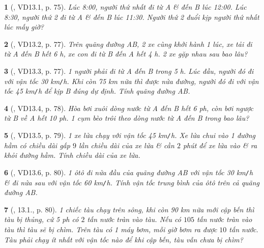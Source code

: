 \documentclass{article}
\newtheorem{baitoan}{}
\begin{document}
\begin{baitoan}[\cite{TLCT_THCS_Toan_6_so_hoc}, VD13.1, p. 75]
	Lúc {\rm8:00}, người thứ nhất đi từ A \& đến B lúc {\rm12:00}. Lúc {\rm8:30}, người thứ 2 đi từ A \& đến B lúc {\rm11:30}. Người thứ 2 đuổi kịp người thứ nhất lúc mấy giờ?
\end{baitoan}

\begin{baitoan}[\cite{TLCT_THCS_Toan_6_so_hoc}, VD13.2, p. 77]
	Trên quãng đường AB, 2 xe cùng khởi hành 1 lúc, xe tải đi từ A đến B hết {\rm6 h}, xe con đi từ B đến A hết {\rm4 h}. 2 xe gặp nhau sau bao lâu?
\end{baitoan}

\begin{baitoan}[\cite{TLCT_THCS_Toan_6_so_hoc}, VD13.3, p. 77]
	1 người phải đi từ A đến B trong {\rm5 h}. Lúc đầu, người đó đi với vận tốc {\rm30 km{\tt/}h}. Khi còn {\rm75 km} nữa thì được nửa đường, người đó đi với vận tốc {\rm45 km{\tt/}h} để kịp B đúng dự định. Tính quãng đường AB.
\end{baitoan}

\begin{baitoan}[\cite{TLCT_THCS_Toan_6_so_hoc}, VD13.4, p. 78]
	Hòa bơi xuôi dòng nước từ A đến B hết {\rm6 ph}, còn bơi ngược từ B về A hết {\rm10 ph}. 1 cụm bèo trôi theo dòng nước từ A đến B trong bao lâu?
\end{baitoan}

\begin{baitoan}[\cite{TLCT_THCS_Toan_6_so_hoc}, VD13.5, p. 79]
	1 xe lửa chạy với vận tốc {\rm45 km{\tt/}h}. Xe lửa chui vào 1 đường hầm có chiều dài gấp $9$ lần chiều dài của xe lửa \& cần $2$ phút để xe lửa vào \& ra khỏi đường hầm. Tính chiều dài của xe lửa.
\end{baitoan}

\begin{baitoan}[\cite{TLCT_THCS_Toan_6_so_hoc}, VD13.6, p. 80]
	1 ôtô đi nửa đầu của quãng đường AB với vận tốc {\rm30 km{\tt/}h} \& đi nửa sau với vận tốc {\rm60 km{\tt/}h}. Tính vận tốc trung bình của ôtô trên cả quãng đường AB.
\end{baitoan}

\begin{baitoan}[\cite{TLCT_THCS_Toan_6_so_hoc}, 13.1., p. 80]
	1 chiếc tàu chạy trên sông, khi còn {\rm90 km} nữa mới cập bến thì tàu bị thủng, cứ {\rm5 ph} có $2$ tấn nước tràn vào tàu. Nếu có $105$ tấn nước tràn vào tàu thì tàu sẽ bị chìm. Trên tàu có 1 máy bơm, mỗi giờ bơm ra được $10$ tấn nước. Tàu phải chạy ít nhất với vận tốc nào để khi cập bến, tàu vẫn chưa bị chìm?
\end{baitoan}
\end{document}
